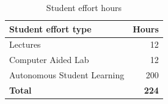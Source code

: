 \documentclass[abstract=on,parskip=full,headings=standardclasses,fontsize=11pt,paper=a4]{scrartcl}
\begin{document}

\begin{table}[h] \centering \onehalfspacing
\caption*{Student effort hours}
\begin{tabular}{ l r} 
\toprule
Student effort type &  Hours \\
\midrule
Lectures & 12 \\
Computer Aided Lab  & 12 \\
Autonomous Student Learning  & 200 \\
\textbf{Total} & \textbf{224} \\
\bottomrule
\end{tabular}
\end{table}
\end{document}
